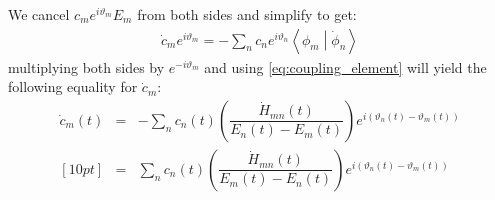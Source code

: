 \documentclass[12pt,a4paper]{article}
\begin{document}
	We cancel $c_{m} e^{i \vartheta_{m}} E_{m}$ from both sides and simplify to get:
	\begin{eqnarray}
		\dot{c}_{m} e^{i \vartheta_{m}} = - \sum_{n} c_{n} e^{i \vartheta_{n}} \left\langle \phi_{m} \middle| \dot{\phi}_{n} \right\rangle
		\label{eq:dot_c_phase}
	\end{eqnarray}
	multiplying both sides by $e^{-i \vartheta_{m}}$ and using \eqref{eq:coupling_element} will yield the following equality for $\dot{c}_{m}$:
	\begin{eqnarray}
		\dot{c}_{m}(t) &=& - \sum_{n} c_{n}(t) \left(\dfrac{\dot{H}_{mn}(t)}{E_{n}(t) - E_{m}(t)}\right) e^{i \left( \vartheta_{n}(t) - \vartheta_{m}(t) \right)} \nonumber\\ [10pt]
		&=& \sum_{n} c_{n}(t) \left(\dfrac{\dot{H}_{mn}(t)}{E_{m}(t) - E_{n}(t)}\right) e^{i \left( \vartheta_{n}(t) - \vartheta_{m}(t) \right)}
		\label{eq:dot_c_final}
	\end{eqnarray}
	
\end{document}
